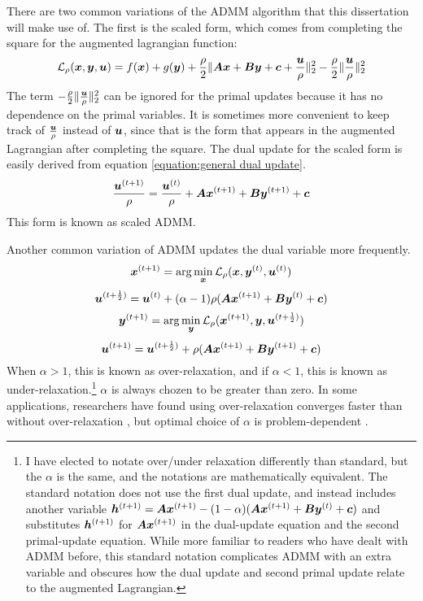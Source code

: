 There are two common variations of the ADMM algorithm that this dissertation will make use of.  The first is the scaled form, which comes from completing the square for the augmented lagrangian function:
%
\begin{equation}
\mathcal{L}_{\rho}(\bm{x},\bm{y},\bm{u}) = f(\bm{x}) + g(\bm{y}) + \frac{\rho}{2}\|\bm{A}\bm{x} + \bm{B}\bm{y} + \bm{c} + \frac{\bm{u}}{\rho}\|_2^2 - \frac{\rho}{2}\|\frac{\bm{u}}{\rho}\|_2^2
\end{equation}
%
The term $-\frac{\rho}{2}\|\frac{\bm{u}}{\rho}\|_2^2$ can be ignored for the primal updates because it has no dependence on the primal variables. It is sometimes more convenient to keep track of $\frac{\bm{u}}{\rho}$ instead of $\bm{u}$, since that is the form that appears in the augmented Lagrangian after completing the square. The dual update for the scaled form is easily derived from equation \ref{equation:general dual update}.
%
\begin{equation}
\frac{\bm{u}^{(t + 1)}}{\rho} = \frac{\bm{u}^{(t)}}{\rho} + \bm{A}\bm{x}^{(t + 1)} + \bm{B}\bm{y}^{(t + 1)} + \bm{c}
\end{equation}
%
This form is known as scaled ADMM.

Another common variation of ADMM updates the dual variable more frequently.
\begin{equation}
\bm{x}^{(t + 1)} = \arg\min_{\bm{x}} \mathcal{L}_{\rho}(\bm{x},\bm{y}^{(t)},\bm{u}^{(t)})
\end{equation}
%
\begin{equation}
\bm{u}^{(t + \frac{1}{2})} = \bm{u}^{(t)} + (\alpha - 1)\rho(\bm{A}\bm{x}^{(t + 1)} + \bm{B}\bm{y}^{(t)} + \bm{c})
\end{equation}
%
\begin{equation}
\bm{y}^{(t + 1)} = \arg\min_{\bm{y}} \mathcal{L}_{\rho}(\bm{x}^{(t + 1)},\bm{y},\bm{u}^{(t + \frac{1}{2})})
\end{equation}
%
\begin{equation}
\bm{u}^{(t + 1)} = \bm{u}^{(t + \frac{1}{2})} + \rho(\bm{A}\bm{x}^{(t + 1)} + \bm{B}\bm{y}^{(t + 1)} + \bm{c})
\end{equation}
%
When $\alpha > 1$, this is known as over-relaxation, and if $\alpha < 1$, this is known as under-relaxation.\footnote{I have elected to notate over/under relaxation differently than standard, but the $\alpha$ is the same, and the notations are mathematically equivalent. The standard notation does not use the first dual update, and instead includes another variable $\bm{h}^{(t + 1)} = \bm{A}\bm{x}^{(t + 1)} - (1 - \alpha)(\bm{A}\bm{x}^{(t + 1)} + \bm{B}\bm{y}^{(t)} + \bm{c})$ and substitutes $\bm{h}^{(t + 1)}$ for $\bm{A}\bm{x}^{(t + 1)}$ in the dual-update equation and the second primal-update equation. While more familiar to readers who have dealt with ADMM before, this standard notation complicates ADMM with an extra variable and obscures how the dual update and second primal update relate to the augmented Lagrangian.} $\alpha$ is always chozen to be greater than zero. In some applications, researchers have found using over-relaxation converges faster than without over-relaxation \cite{eckstein1994parallel}, but optimal choice of $\alpha$ is problem-dependent \cite{nishihara2015general}.

